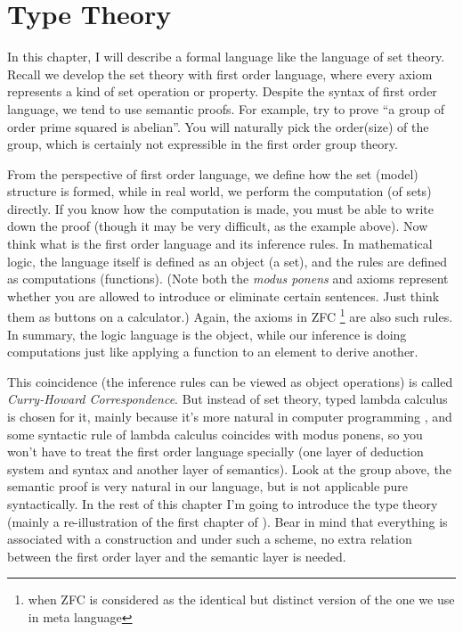 \chapter{Type Theory}
\label{type-theory}

In this chapter, I will describe a formal language like the language of 
set theory. Recall we develop the set theory with first order language,
where every axiom represents a kind of set operation or property. Despite
the syntax of first order language, we tend to use semantic proofs. For
example, try to prove ``a group of order prime squared is abelian''.
You will naturally pick the order(size) of the group, which is certainly
not expressible in the first order group theory. 

From the perspective of first order language, we define how the set 
(model) structure is formed, while in real world, we perform the 
computation (of sets) directly. If you know how the computation is made, 
you must be able to write down the proof (though it may be very difficult, 
as the example above). Now think what is the first order language and 
its inference rules. In mathematical logic, the language itself is 
defined as an object (a set), and the rules are defined as computations 
(functions). (Note both the {\it modus ponens} and axioms 
represent whether you are allowed to introduce or eliminate certain 
sentences. Just think them as buttons on a calculator.) Again, the axioms 
in ZFC \footnote{when ZFC is considered as the identical but distinct 
version of the one we use in meta language} are also such rules. In 
summary, the logic language is the object, while our inference is doing 
computations just like applying a function to an element to derive another. 

This coincidence (the inference rules can be viewed as 
object operations) is called {\it Curry-Howard 
Correspondence}. But instead of set theory, typed lambda calculus
\cite{Curry-Howard} is chosen for it, mainly because it's more natural 
in computer programming \cite{coq,SF}, and some syntactic rule of lambda 
calculus coincides with modus ponens, so you won't have to treat the 
first order language specially
(one layer of deduction system and syntax and another layer of semantics). 
Look at the group above, the semantic proof is very natural in our 
language, but is not applicable pure syntactically. In the rest of this 
chapter I'm going to introduce the type theory (mainly a re-illustration 
of the first chapter of \cite{homotopy-type-theory}). Bear in mind that 
everything is associated with a construction and under such a scheme, 
no extra relation between the first order layer and the semantic layer
is needed. 

